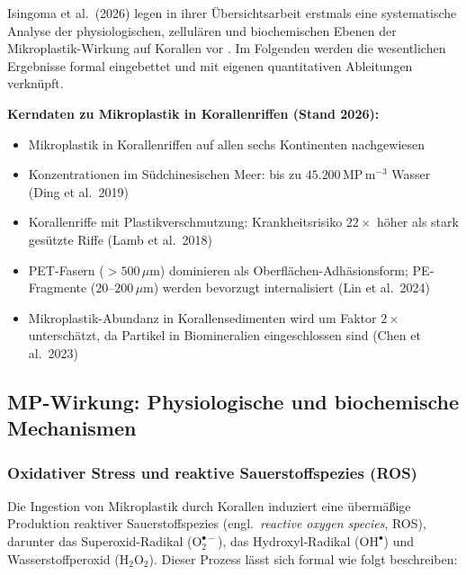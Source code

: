 ﻿\documentclass[12pt,a4paper]{article}
\theoremstyle{definition}
\theoremstyle{remark}
\newcommand{\MP}{Mikroplastik}
\begin{document}
Isingoma et al.\ (2026) legen in ihrer Übersichtsarbeit erstmals eine systematische
Analyse der physiologischen, zellulären und biochemischen Ebenen der
\MP{}-Wirkung auf Korallen vor \cite{isingoma2026microplastics}. Im Folgenden
werden die wesentlichen Ergebnisse formal eingebettet und mit eigenen
quantitativen Ableitungen verknüpft.

\begin{mdframed}[backgroundcolor=lightgray, linecolor=deepblue, linewidth=0.8pt]
\textbf{Kerndaten zu Mikroplastik in Korallenriffen (Stand 2026):}
\begin{itemize}[noitemsep]
  \item Mikroplastik in Korallenriffen auf allen sechs Kontinenten nachgewiesen
        \cite{isingoma2026microplastics}
  \item Konzentrationen im S\"udchinesischen Meer: bis zu
        $45{.}200$\,MP\,m$^{-3}$ Wasser (Ding et al.\ 2019)
  \item Korallenriffe mit Plastikverschmutzung: Krankheitsrisiko $22\times$ höher als
        stark ges\"utzte Riffe (Lamb et al.\ 2018)
  \item PET-Fasern (${>}500\,\mu$m) dominieren als Oberfl\"achen-Adhäsionsform;
        PE-Fragmente ($20$--$200\,\mu$m) werden bevorzugt internalisiert
        (Lin et al.\ 2024)
  \item Mikroplastik-Abundanz in Korallensedimenten wird um Faktor $2\times$ 
        unterschätzt, da Partikel in Biomineralien eingeschlossen sind
        (Chen et al.\ 2023)
\end{itemize}
\end{mdframed}

\subsection{MP-Wirkung: Physiologische und biochemische Mechanismen}
\label{subsec:mechanismen}

\subsubsection{Oxidativer Stress und reaktive Sauerstoffspezies (ROS)}

Die Ingestion von \MP{} durch Korallen induziert eine übermäßige Produktion
reaktiver Sauerstoffspezies (engl.\ \textit{reactive oxygen species}, ROS),
darunter das Superoxid-Radikal ($\text{O}_2^{\bullet-}$), das Hydroxyl-Radikal
($\text{OH}^\bullet$) und Wasserstoffperoxid ($\text{H}_2\text{O}_2$).
Dieser Prozess l\"asst sich formal wie folgt beschreiben:
\end{document}

